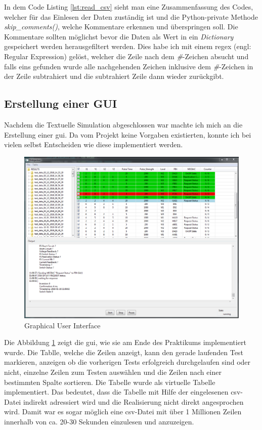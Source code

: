 
In dem Code Listing \ref{lst:read_csv} sieht man eine Zusammenfassung des Codes, welcher für 
das Einlesen der Daten zuständig ist und die Python-private Methode \textit{skip\_comments()}, 
welche Kommentare erkennen und überspringen soll. Die Kommentare sollten möglichst bevor die 
Daten als Wert in ein \textit{Dictionary} gespeichert werden herausgefiltert werden. Dies habe 
ich mit einem \ac{regex} (engl: Regular Expression) gelöst, welcher die Zeile nach dem 
\textit{\#}-Zeichen absucht und falls eins gefunden wurde alle nachgehenden Zeichen inklusive 
dem \textit{\#}-Zeichen in der Zeile subtrahiert und die subtrahiert Zeile dann wieder 
zurückgibt.


\subsection{Erstellung einer GUI}
\label{subsec:create_gui}

Nachdem die Textuelle Simulation abgeschlossen war machte ich mich an die Erstellung einer 
\ac{gui}. Da vom Projekt keine Vorgaben existierten, konnte ich bei vielen selbst Entscheiden 
wie diese implementiert werden.

\begin{figure}[H]
	\centering
	\includegraphics[width=1\textwidth, height=0.75\textwidth]{graphics/GUI.png}
	\caption{Graphical User Interface}
	\label{fig:pipeline}
\end{figure}

Die Abbildung \ref{fig:pipeline} zeigt die \ac{gui}, wie sie am Ende des Praktikums 
implementiert wurde. Die Tablle, welche die Zeilen anzeigt, kann den gerade laufenden Test 
markieren, anzeigen ob die vorherigen Tests erfolgreich durchgelaufen sind oder nicht, einzelne 
Zeilen zum Testen auswählen und die Zeilen nach einer bestimmten Spalte sortieren. 
Die Tabelle wurde als virtuelle Tabelle implementiert. Das bedeutet, dass die Tabelle mit Hilfe 
der eingelesenen \ac{csv}-Datei indirekt adressiert wird und die Realisierung nicht direkt 
angesprochen wird. Damit war es sogar möglich eine \ac{csv}-Datei mit über 1 Millionen Zeilen 
innerhalb von ca. 20-30 Sekunden einzulesen und anzuzeigen.